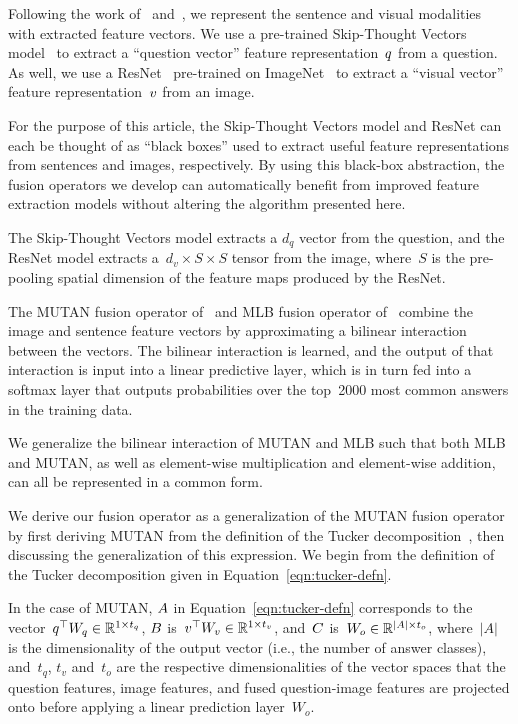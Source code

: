 Following the work of~\cite{Kim2017} and~\cite{ben2017mutan}, we represent the
sentence and visual modalities with extracted feature vectors. We use a
pre-trained Skip-Thought Vectors model~\cite{kiros2015skip}
to extract a ``question vector'' feature representation~$q$ from a question.
As well, we use a ResNet~\cite{he2016deep} pre-trained on
ImageNet~\cite{russakovsky2015imagenet} to extract a ``visual vector'' feature
representation~$v$ from an image.

For the purpose of this article, the Skip-Thought Vectors model and ResNet can
each be thought of as ``black boxes'' used to extract useful feature
representations from sentences and images, respectively. By using this
black-box abstraction, the fusion operators we develop can automatically
benefit from improved feature extraction models without altering the algorithm
presented here.

The Skip-Thought Vectors model extracts a $d_q$ vector from the question, and
the ResNet model extracts a~$d_v \times S \times S$ tensor from the image,
where~$S$ is the pre-pooling spatial dimension of the feature maps produced by
the ResNet.

The MUTAN fusion operator of~\cite{ben2017mutan} and MLB fusion operator
of~\cite{Kim2017} combine the image and sentence feature vectors by
approximating a bilinear interaction between the vectors. The bilinear
interaction is learned, and the output of that interaction is input into a
linear predictive layer, which is in turn fed into a softmax layer that outputs
probabilities over the top~\num{2000} most common answers in the training data.

We generalize the bilinear interaction of MUTAN and MLB such that both MLB and
MUTAN, as well as element-wise multiplication and element-wise addition, can
all be represented in a common form.

We derive our fusion operator as a generalization of the MUTAN fusion operator
by first deriving MUTAN from the definition of the Tucker
decomposition~\cite{kolda2009tensor}, then discussing the generalization of
this expression.  We begin from the definition of the Tucker decomposition
given in Equation~\ref{eqn:tucker-defn}.

In the case of MUTAN, $A$ in Equation~\ref{eqn:tucker-defn} corresponds to the
vector~$q^\top{} W_{q}{} \in \mathbb{R}^{1 \times t_q}$, $B$
is~$v^\top{} W_{v}{} \in \mathbb{R}^{1 \times t_v}$,
and~$C$ is~$W_o \in \mathbb{R}^{|A| \times t_o}$, where~$|A|$ is the
dimensionality of the output vector (i.e., the number of answer classes),
and~$t_q$, $t_v$ and~$t_o$ are the respective dimensionalities of the vector
spaces that the question features, image features, and fused question-image
features are projected onto before applying a linear prediction layer~$W_o$.

